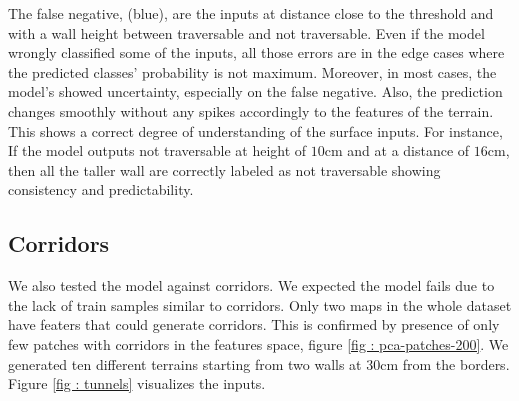 \documentclass[../document.tex]{subfiles}
\begin{document}
The false negative, (blue), are the inputs at distance close to the threshold and with a wall height between traversable and not traversable. Even if the model wrongly classified some of the inputs, all those errors are in the edge cases where the predicted classes' probability is not maximum. Moreover, in most cases, the model's showed uncertainty, especially on the false negative. Also, the prediction changes smoothly without any spikes accordingly to the features of the terrain. This shows a correct degree of understanding of the surface inputs. For instance, If the model outputs not traversable at height of $10$cm and at a distance of $16$cm, then all the taller wall are correctly labeled as not traversable showing consistency and predictability. 
\subsection{Corridors}
We also tested the model against corridors. We expected the model fails due to the lack of train samples similar to corridors. Only two maps in the whole dataset have featers that could generate corridors. This is confirmed by presence of only few patches with corridors in the features space, figure \ref{fig : pca-patches-200}. We generated ten different terrains starting from two walls at $30$cm from the borders. Figure \ref{fig : tunnels}  visualizes the inputs.
\end{document}
